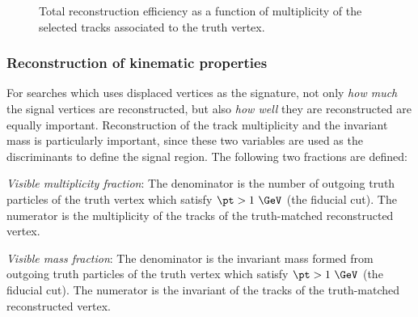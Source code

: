\documentclass[NOTE, atlasdraft=true, texlive=2018, UKenglish]{\ATLASLATEXPATH atlasdoc}
\begin{document}
\begin{figure}[t]
\begin{center}
\caption{Total reconstruction efficiency as a function of multiplicity of the selected tracks associated to the truth vertex.}
\label{fig:effMult}
\end{center}
\end{figure}


\subsubsection{Reconstruction of kinematic properties}
For searches which uses displaced vertices as the signature, not only \emph{how much} the signal vertices are reconstructed, but also \emph{how well} they are reconstructed are equally important. Reconstruction of the track multiplicity and the invariant mass is particularly important, since these two variables are used as the discriminants to define the signal region. The following two fractions are defined:

\begin{description}
\item{\emph{Visible multiplicity fraction}}: The denominator is the number of outgoing truth particles of the truth vertex which satisfy $\pt>1~\GeV$ (the fiducial cut). The numerator is the multiplicity of the tracks of the truth-matched reconstructed vertex.
\item{\emph{Visible mass fraction}}: The denominator is the invariant mass formed from outgoing truth particles of the truth vertex which satisfy $\pt>1~\GeV$ (the fiducial cut). The numerator is the invariant of the tracks of the truth-matched reconstructed vertex.
\end{description}
\end{document}

